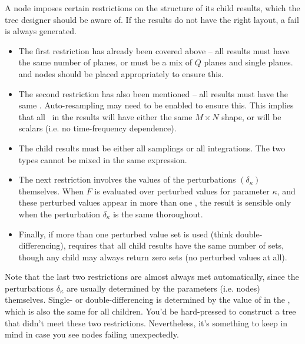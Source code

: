   A  node imposes certain restrictions on the structure of its child
  results, which the tree designer should be aware of. If the results do not
  have the right layout, a fail is always generated.
  
  \begin{itemize}
  
  \item The first restriction has already been covered above -- all results must have
  the same number of planes, or must be a mix of $Q$ planes and single planes.
   and  nodes should be placed appropriately to ensure
  this.
  
  \item The second restriction has also been mentioned -- all results must have
  the same \Cells. Auto-resampling may need to be enabled to ensure this. This
  implies that all \Vells\ in the results will have either the same $M\times N$
  shape, or will be scalars (i.e. no time-frequency dependence).
  
  \item The child results must be either all samplings or all integrations. The
  two types cannot be mixed in the same expression.

  \item The next restriction involves the values of the perturbations
  $(\delta_\kappa)$ themselves. When $F$ is evaluated over perturbed values for
  parameter $\kappa$, and these perturbed values appear in more than one
  \VellSet, the result is sensible only when the perturbation
  $\delta_\kappa$ is the same thoroughout. 

  \item Finally, if more than one perturbed value set is used (think
  double-differencing),  requires that all child results have the
  same number of sets, though any child may always return zero sets (no
  perturbed values at all).

  \end{itemize}
  
  Note that the last two restrictions are almost always met automatically,
  since the perturbations $\delta_\kappa$ are usually determined by the
  parameters (i.e.  nodes) themselves. Single- or double-differencing
  is determined by the value of  in the \Request, which is also
  the same for all children. You'd be hard-pressed to construct a tree that
  didn't meet these two restrictions. Nevertheless, it's something to keep in
  mind in case you see  nodes failing unexpectedly.

